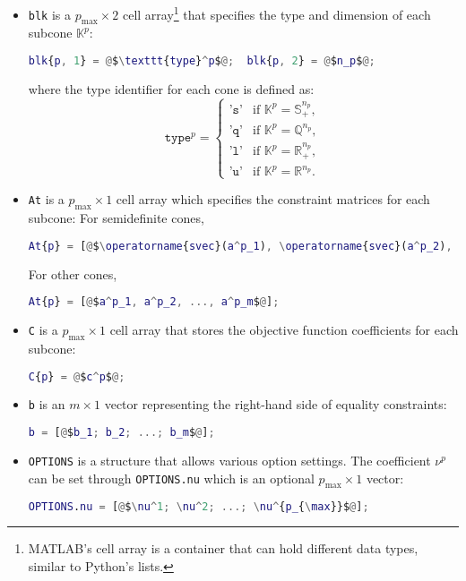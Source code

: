 \begin{itemize}
    \item \texttt{blk} is a $p_{\max} \times 2$ cell array\footnote{MATLAB's cell array is a container that can hold different data types, similar to Python's lists.} that specifies the type and dimension of each subcone $\mathbb{K}^p$: 
\begin{lstlisting}[language=Matlab,escapechar=\@]
blk{p, 1} = @$\texttt{type}^p$@;  blk{p, 2} = @$n_p$@;
\end{lstlisting}
where the type identifier for each cone is defined as:
\[
\texttt{type}^p = \begin{cases}
\texttt{'s'} & \text{if } \mathbb{K}^p = \mathbb{S}_+^{n_p}, \\
\texttt{'q'} & \text{if } \mathbb{K}^p = \mathbb{Q}^{n_p}, \\
\texttt{'l'} & \text{if } \mathbb{K}^p = \mathbb{R}^{n_p}_+, \\
\texttt{'u'} & \text{if } \mathbb{K}^p = \mathbb{R}^{n_p}. 
\end{cases}
\]
% 
\item \texttt{At} is a $p_{\max} \times 1$ cell array which specifies the constraint matrices for each subcone: For semidefinite cones, 
\begin{lstlisting}[language=Matlab,escapechar=\@]
At{p} = [@$\operatorname{svec}(a^p_1), \operatorname{svec}(a^p_2), ..., \operatorname{svec}(a^p_m)$@];
\end{lstlisting}
For other cones,
\begin{lstlisting}[language=Matlab,escapechar=\@]
At{p} = [@$a^p_1, a^p_2, ..., a^p_m$@];
\end{lstlisting}
% 
\item \texttt{C} is a $p_{\max} \times 1$ cell array that stores the objective function coefficients for each subcone:
\begin{lstlisting}[language=Matlab,escapechar=\@]
  C{p} = @$c^p$@;
\end{lstlisting}
%
\item \texttt{b} is an $m \times 1$ vector representing the right-hand side of equality constraints:
\begin{lstlisting}[language=Matlab,escapechar=\@]
  b = [@$b_1; b_2; ...; b_m$@];
\end{lstlisting}
%
\item \texttt{OPTIONS} is a structure that allows various option settings. 
The coefficient $\nu^p$ can be set through \texttt{OPTIONS.nu} which is an optional $p_{\max} \times 1$ vector:
\begin{lstlisting}[language=Matlab,escapechar=\@]
OPTIONS.nu = [@$\nu^1; \nu^2; ...; \nu^{p_{\max}}$@];
\end{lstlisting}
\end{itemize}


